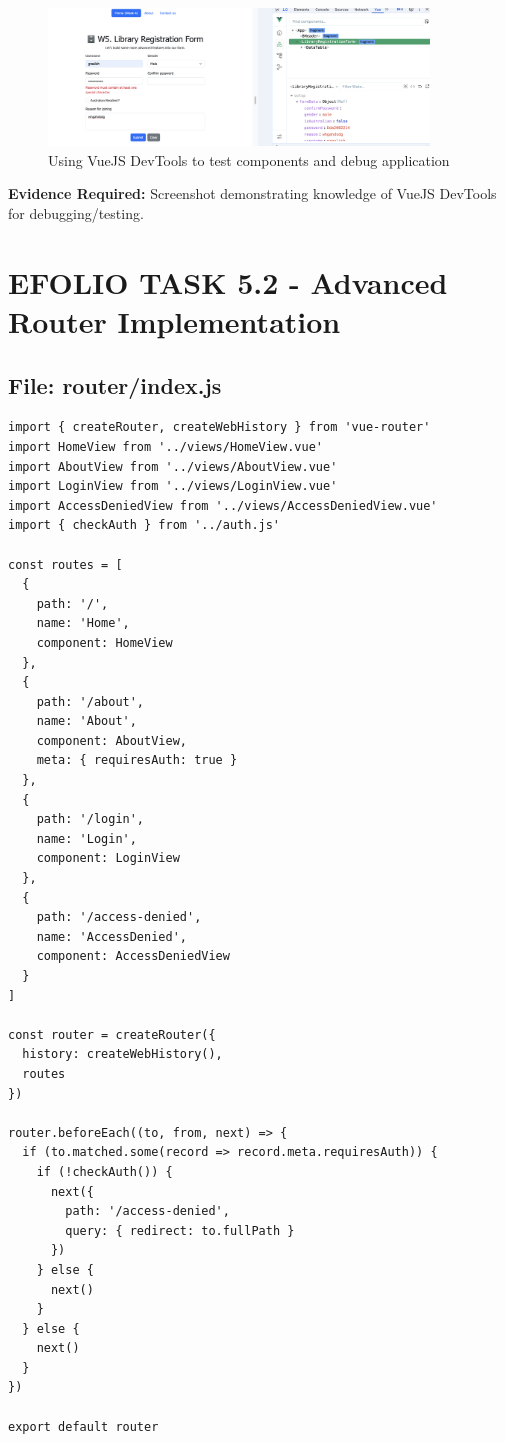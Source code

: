 \documentclass[11pt,a4paper]{article}
\begin{document}
\begin{figure}[h]
     \centering
     \includegraphics[width=0.9\textwidth]{vue_devtools_testing.png}
     \caption{Using VueJS DevTools to test components and debug application}
     \label{fig:vue_devtools}
\end{figure}

\textbf{Evidence Required:} Screenshot demonstrating knowledge of VueJS DevTools for debugging/testing.

\newpage


\section{EFOLIO TASK 5.2 - Advanced Router Implementation}

\subsection{File: router/index.js}

\begin{lstlisting}[caption=Router configuration with navigation guards]
import { createRouter, createWebHistory } from 'vue-router'
import HomeView from '../views/HomeView.vue'
import AboutView from '../views/AboutView.vue'
import LoginView from '../views/LoginView.vue'
import AccessDeniedView from '../views/AccessDeniedView.vue'
import { checkAuth } from '../auth.js'

const routes = [
  {
    path: '/',
    name: 'Home',
    component: HomeView
  },
  {
    path: '/about',
    name: 'About',
    component: AboutView,
    meta: { requiresAuth: true }
  },
  {
    path: '/login',
    name: 'Login',
    component: LoginView
  },
  {
    path: '/access-denied',
    name: 'AccessDenied',
    component: AccessDeniedView
  }
]

const router = createRouter({
  history: createWebHistory(),
  routes
})

router.beforeEach((to, from, next) => {
  if (to.matched.some(record => record.meta.requiresAuth)) {
    if (!checkAuth()) {
      next({
        path: '/access-denied',
        query: { redirect: to.fullPath }
      })
    } else {
      next()
    }
  } else {
    next()
  }
})

export default router
\end{lstlisting}
\end{document}
